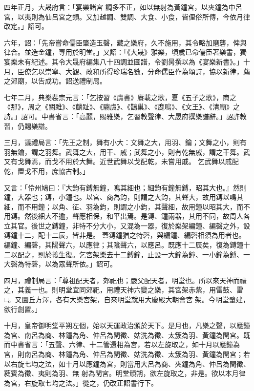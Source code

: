 \begin{pinyinscope}
 四年正月，大晟府言：「宴樂諸宮
 調多不正，如以無射為黃鐘宮，以夾鐘為中呂宮，以夷則為仙呂宮之類。又加越調、雙調、大食、小食，皆俚俗所傳，今依月律改定。」詔可。



 六年，詔：「先帝嘗命儒臣肇造玉磬，藏之樂府，久不施用，其令略加磨礱，俾與律合。並造金鐘，專用於明堂。」又詔：「《大晟》雅樂，頃歲已命儒臣著樂書，獨宴樂未有紀述。其令大晟府編集八十四調並圖譜，令劉昺撰以為《宴樂新書》。」十月，臣僚乞以崇寧、大觀、政和所得珍瑞名數，分命儒臣作為頌詩，協以新律，薦
 之郊廟，以告成功。詔送禮制局。



 七年二月，典樂裴宗元言：「乞按習《虞書》賡載之歌，夏《五子之歌》，商之《那》，周之《關雎》、《麟趾》、《騶虞》、《鵲巢》、《鹿鳴》、《文王》、《清廟》之詩。」詔可。中書省言：「高麗，賜雅樂，乞習教聲律、大晟府撰樂譜辭。」詔許教習，仍賜樂譜。



 三月，議禮局言：「先王之制，舞有小大：文舞之大，用羽、鑰；文舞之小，則有羽無鑰，謂之羽舞。武舞之大，用干、戚；武舞之小，則有乾無戚，謂之干舞。武又有戈舞焉，而戈不用於大舞。近世武舞以戈配乾，未嘗用戚。
 乞武舞以戚配乾，置戈不用，庶協古制。」



 又言：「伶州鳩曰：『大鈞有鎛無鐘，鳴其細也；細鈞有鐘無鎛，昭其大也。』然則鐘，大器也；鎛，小鐘也。以宮、商為鈞，則謂之大鈞，其聲大，故用鎛以鳴其細，而不用鐘；以角、征、羽為鈞，則謂之小鈞，其聲細，故用鐘以昭其大，而不用鎛。然後細大不逾，聲應相保，和平出焉。是鎛、鐘兩器，其用不同，故周人各立其官。後世之鎛鐘，非特不分大小，又混為一器，復於樂架編鐘、編磬之外，設鎛鐘十二，配十二辰，皆非是。
 蓋鎛鐘猶之特磬，與編鐘、編磬相須為用者也。編鐘、編磬，其陽聲六，以應律；其陰聲六，以應呂。既應十二辰矣，復為鎛鐘十二以配之，則於義生復。乞宮架樂去十二鎛鐘，止設一大鐘為鐘、一小鐘為鎛、一大磬為特磬，以為眾聲所依。」詔可。



 四月，禮制局言：「尊祖配天者，郊祀也；嚴父配天者，明堂也。所以來天神而禮之，其義一也。則明堂宜同郊祀，用禮天神六變之樂，其宮架赤紫，用雷鼓、雷□。又圜丘方澤，各有大樂宮架，自來明堂就用大慶殿大朝會宮
 架。今明堂肇建，欲行創置。」



 十月，皇帝御明堂平朔左個，始以天運政治頒於天下。是月也，凡樂之聲，以應鐘為宮、南呂為商、林鐘為角、仲呂為閏徵、姑洗為徵、太簇為羽、黃鐘為閏宮。既而中書省言：「五聲、六律、十二管還相為宮，若以左旋取之，如十月以應鐘為宮，則南呂為商、林鐘為角、仲呂為閏徵、姑洗為徵、太簇為羽、黃鐘為閏宮；若以右旋七均之法，如十月以應鐘為宮，則當用大呂為商、夾鐘為角、仲呂為閏徵、蕤賓為徵、夷則為羽、無
 射為閏宮。明堂頒朔，欲左旋取之，非是。欲以本月律為宮，右旋取七均之法。」從之，仍改正詔書行下。




\end{pinyinscope}
